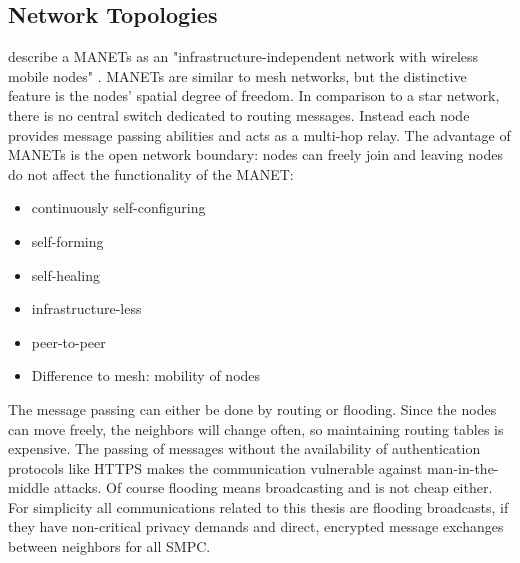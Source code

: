 	\subsection{Network Topologies}
	\label{Network Topologies}
	
	\textcite{Dorri2015} describe a \gls{MANET}s as an "infrastructure-independent network with wireless mobile nodes" \autocite[p. 15]{Dorri2015}. \gls{MANET}s are similar to mesh networks, but the distinctive feature is the nodes' spatial degree of freedom. In comparison to a star network, there is no central switch dedicated to routing messages. Instead each node provides message passing abilities and acts as a multi-hop relay.
	The advantage of \gls{MANET}s is the open network boundary: nodes can freely join and leaving nodes do not affect the functionality of the \gls{MANET}:
	
	\begin{itemize}  
		\item continuously self-configuring
		\item self-forming
		\item self-healing
		\item infrastructure-less
		\item peer-to-peer
		\item Difference to mesh: mobility of nodes
	\end{itemize}
			
	The message passing can either be done by routing or flooding. Since the nodes can move freely, the neighbors will change often, so maintaining routing tables is expensive. The passing of messages without the availability of authentication protocols like \gls{HTTPS} makes the communication vulnerable against man-in-the-middle attacks. Of course flooding means broadcasting and is not cheap either. For simplicity all communications related to this thesis are flooding broadcasts, if they have non-critical privacy demands and direct, encrypted message exchanges between neighbors for all \gls{SMPC}.
	
		
